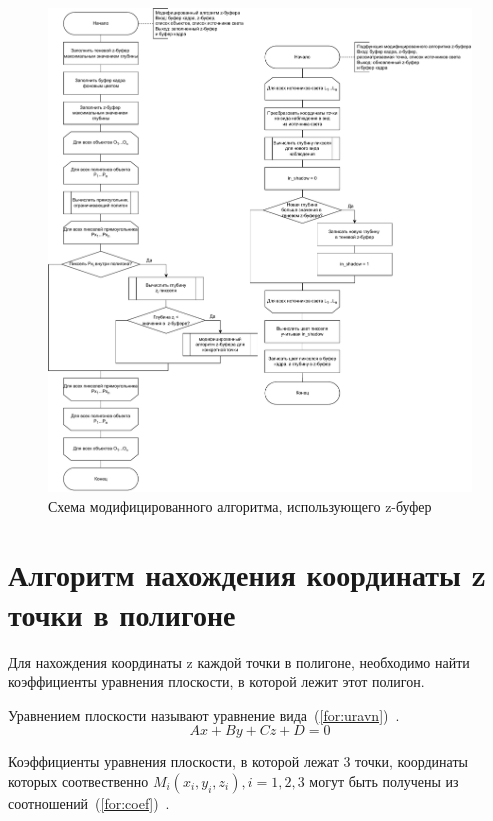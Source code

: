 \begin{figure}[h!]
	\centering
	\includegraphics[width=0.96\linewidth]{img/z_mod}
	\caption{Схема модифицированного алгоритма, использующего z-буфер}
	\label{fig:z_mod}
\end{figure}
\clearpage

\section{Алгоритм нахождения координаты z точки в полигоне}

Для нахождения координаты z каждой точки в полигоне, необходимо найти коэффициенты уравнения плоскости, в которой лежит этот полигон.

Уравнением плоскости называют уравнение вида~(\ref{for:uravn})~\cite{angem}.
\begin{equation}
	\label{for:uravn}
	Ax + By + Cz + D = 0
\end{equation}

Коэффициенты уравнения плоскости, в которой лежат 3 точки, координаты которых соотвественно $M_i(x_i, y_i, z_i), i = 1, 2, 3$ могут быть получены из соотношений~(\ref{for:coef})~\cite{angem}.
\begin{equation}
	\label{for:coef}
\end{equation}

